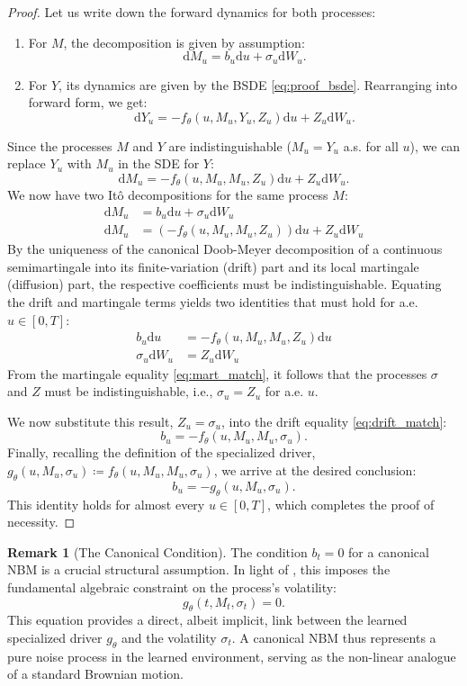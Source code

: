\documentclass[qian]{imsart}
\newcommand{\dd}{\mathrm{d}}
\theoremstyle{plain}
\theoremstyle{definition}
\newtheorem{remark}[theorem]{Remark}
\begin{document}
\begin{proof}
Let us write down the forward dynamics for both processes:
\begin{enumerate}
    \item For $M$, the decomposition is given by assumption:
    \[ \dd M_u = b_u \dd u + \sigma_u \dd W_u. \]
    \item For $Y$, its dynamics are given by the BSDE \eqref{eq:proof_bsde}. Rearranging into forward form, we get:
    \[ \dd Y_u = -f_\theta(u, M_u, Y_u, Z_u) \dd u + Z_u \dd W_u. \]
\end{enumerate}
Since the processes $M$ and $Y$ are indistinguishable ($M_u=Y_u$ a.s. for all $u$), we can replace $Y_u$ with $M_u$ in the SDE for $Y$:
\[ \dd M_u = -f_\theta(u, M_u, M_u, Z_u) \dd u + Z_u \dd W_u. \]
We now have two Itô decompositions for the same process $M$:
\begin{align*}
    \dd M_u &= b_u \dd u + \sigma_u \dd W_u \\
    \dd M_u &= \left( -f_\theta(u, M_u, M_u, Z_u) \right) \dd u + Z_u \dd W_u
\end{align*}
By the uniqueness of the canonical Doob-Meyer decomposition of a continuous semimartingale into its finite-variation (drift) part and its local martingale (diffusion) part, the respective coefficients must be indistinguishable. Equating the drift and martingale terms yields two identities that must hold for a.e. $u \in [0,T]$:
\begin{align}
    b_u \dd u &= -f_\theta(u, M_u, M_u, Z_u) \dd u \label{eq:drift_match} \\
    \sigma_u \dd W_u &= Z_u \dd W_u \label{eq:mart_match}
\end{align}
From the martingale equality \eqref{eq:mart_match}, it follows that the processes $\sigma$ and $Z$ must be indistinguishable, i.e., $\sigma_u = Z_u$ for a.e. $u$.

We now substitute this result, $Z_u = \sigma_u$, into the drift equality \eqref{eq:drift_match}:
\[
    b_u = -f_\theta(u, M_u, M_u, \sigma_u).
\]
Finally, recalling the definition of the specialized driver, $g_\theta(u, M_u, \sigma_u) \coloneqq f_\theta(u, M_u, M_u, \sigma_u)$, we arrive at the desired conclusion:
\[
    b_u = -g_\theta(u, M_u, \sigma_u).
\]
This identity holds for almost every $u \in [0,T]$, which completes the proof of necessity.
\end{proof}

\begin{remark}[The Canonical Condition]
The condition $b_t=0$ for a canonical NBM is a crucial structural assumption. In light of , this imposes the fundamental algebraic constraint on the process's volatility:
\[ g_\theta(t, M_t, \sigma_t) = 0. \]
This equation provides a direct, albeit implicit, link between the learned specialized driver $g_\theta$ and the volatility $\sigma_t$. A canonical NBM thus represents a pure noise process in the learned environment, serving as the non-linear analogue of a standard Brownian motion.
\end{remark}
\end{document}

